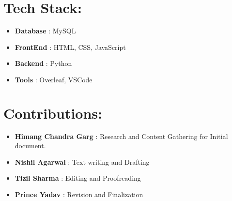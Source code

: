 \documentclass{article}
\begin{document}
\section{Tech Stack:}
\begin{itemize}
    \item \textbf{Database} : MySQL
    \item \textbf{FrontEnd} : HTML, CSS, JavaScript
    \item \textbf{Backend} : Python
    \item \textbf{Tools} : Overleaf, VSCode 
    \end{itemize}
    
\section{Contributions:}
\begin{itemize}
    \item \textbf{Himang Chandra Garg} : Research and Content Gathering for Initial document.
    \item \textbf{Nishil Agarwal} : Text writing and Drafting
    \item \textbf{Tizil Sharma} : Editing and Proofreading
    \item \textbf{Prince Yadav} : Revision and Finalization
    \end{itemize}
\end{document}
